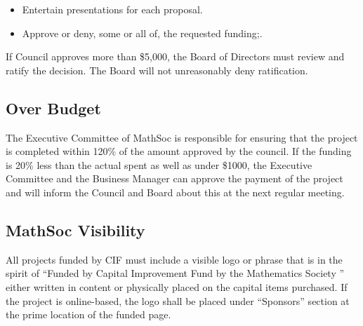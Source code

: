 \begin{itemize}
\item Entertain presentations for each proposal.
\item Approve or deny, some or all of, the requested funding;.
\end{itemize}
If Council approves more than \$5,000, the Board of Directors must review and ratify 
the decision. The Board will not unreasonably deny ratification.

\subsection{Over Budget}
The Executive Committee  of MathSoc is responsible for ensuring that the project is 
completed within 120\% of the amount approved by the council. If the funding is 20\% 
less than the actual spent as well as under \$1000, the Executive Committee and the 
Business Manager can approve the payment of the project and will inform the Council 
and Board about this at the next regular meeting. 

\subsection{MathSoc Visibility}
All projects funded by CIF must include a visible logo or phrase that is in the spirit
of “Funded by Capital Improvement Fund by the Mathematics Society ” either written in 
content or physically placed on the capital items purchased. If the project is 
online-based, the logo shall be placed under “Sponsors” section at the prime location 
of the funded page. 
